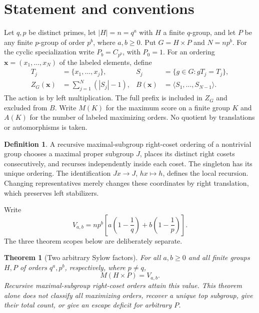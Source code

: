 \documentclass[11pt,letterpaper]{article}
\newtheorem{theorem}{Theorem}
\theoremstyle{definition}\newtheorem{definition}{Definition}
\begin{document}
\section{Statement and conventions}
Let $q,p$ be distinct primes, let $|H|=n=q^a$ with $H$ a finite $q$-group, and let $P$ be any finite $p$-group of order $p^b$, where $a,b\ge0$. Put $G=H\times P$ and $N=np^b$. For the cyclic specialization write $P_b=C_{p^b}$, with $P_0=1$. For an ordering $\mathbf{x}=(x_1,\ldots,x_N)$ of the labeled elements, define
\begin{align}
T_j&=\{x_1,\ldots,x_j\},& S_j&=\{g\in G:gT_j=T_j\},\label{eq:prefix}\\
Z_G(\mathbf{x})&=\sum_{j=1}^{N}(|S_j|-1),& B(\mathbf{x})&=\langle S_1,\ldots,S_{N-1}\rangle.\label{eq:score}
\end{align}
The action is by left multiplication. The full prefix is included in $Z_G$ and excluded from $B$. Write $M(K)$ for the maximum score on a finite group $K$ and $A(K)$ for the number of labeled maximizing orders. No quotient by translations or automorphisms is taken.

\begin{definition}
A recursive maximal-subgroup right-coset ordering of a nontrivial group chooses a maximal proper subgroup $J$, places its distinct right cosets consecutively, and recurses independently inside each coset. The singleton has its unique ordering. The identification $Jx\to J$, $hx\mapsto h$, defines the local recursion. Changing representatives merely changes these coordinates by right translation, which preserves left stabilizers.
\end{definition}

Write
\begin{equation}
V_{a,b}=np^b\left[a\left(1-\frac1q\right)+b\left(1-\frac1p\right)\right].\label{eq:value}
\end{equation}
The three theorem scopes below are deliberately separate.

\begin{theorem}[Two arbitrary Sylow factors]\label{thm:two-sylow}
For all $a,b\ge0$ and all finite groups $H,P$ of orders $q^a,p^b$, respectively, where $p\ne q$,
\[
M(H\times P)=V_{a,b}.
\]
Recursive maximal-subgroup right-coset orders attain this value. This theorem alone does not classify all maximizing orders, recover a unique top subgroup, give their total count, or give an escape deficit for arbitrary $P$.
\end{theorem}
\end{document}
